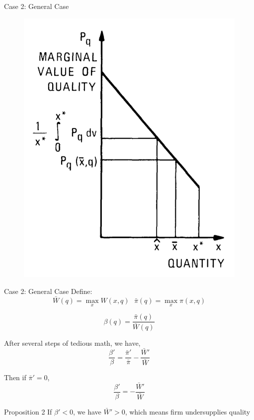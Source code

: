 \documentclass[10pt]{beamer}
\begin{document}
\begin{frame}{Case 2: General Case}
\begin{figure}
    \centering
    \includegraphics[width = .6\textwidth]{spence2.png}
    \label{fig:2}
\end{figure}
\end{frame}

\begin{frame}{Case 2: General Case}
Define:
\begin{equation}
    \bar{W}(q) = \max_x W(x,q) \ \ \  \bar{\pi}(q) = \max_x \pi(x,q)
\end{equation}

\begin{equation}
    \beta (q) = \frac{\bar{\pi}(q)}{\bar{W}(q)}
\end{equation}

After several steps of tedious math, we have,
\begin{equation}
    \frac{\beta'}{\beta} =\frac{\bar{\pi}'}{\bar{\pi}} - \frac{\bar{W}'}{\bar{W}}
\end{equation}

Then if $\bar{\pi}' = 0$, 
\begin{equation}
    \frac{\beta'}{\beta} = - \frac{\bar{W}'}{\bar{W}}
\end{equation}

\begin{block}{Proposition 2}
If $\beta'<0$, we have $\bar{W}' > 0$, which means firm undersupplies quality
\end{block}
\end{frame}
\end{document}
